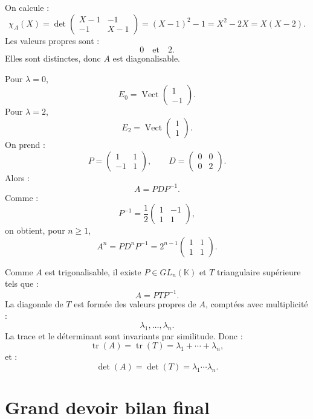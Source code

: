 \documentclass[11pt,a4paper]{article}
\newcommand{\K}{\mathbb K}
\newcommand{\Vect}{\operatorname{Vect}}
\newcommand{\tr}{\operatorname{tr}}
\begin{document}
\begin{correctionbox}[11]
On calcule :
\[
\chi_A(X)=
\det
\begin{pmatrix}
X-1&-1\\
-1&X-1
\end{pmatrix}
=
(X-1)^2-1
=
X^2-2X
=
X(X-2).
\]
Les valeurs propres sont :
\[
0
\quad\text{et}\quad
2.
\]
Elles sont distinctes, donc \(A\) est diagonalisable.

Pour \(\lambda=0\),
\[
E_0=\Vect
\begin{pmatrix}
1\\-1
\end{pmatrix}.
\]
Pour \(\lambda=2\),
\[
E_2=\Vect
\begin{pmatrix}
1\\1
\end{pmatrix}.
\]
On prend :
\[
P=
\begin{pmatrix}
1&1\\
-1&1
\end{pmatrix},
\qquad
D=
\begin{pmatrix}
0&0\\
0&2
\end{pmatrix}.
\]
Alors :
\[
A=PDP^{-1}.
\]
Comme :
\[
P^{-1}=\frac12
\begin{pmatrix}
1&-1\\
1&1
\end{pmatrix},
\]
on obtient, pour \(n\geq1\),
\[
A^n=PD^nP^{-1}
=
2^{n-1}
\begin{pmatrix}
1&1\\
1&1
\end{pmatrix}.
\]
\end{correctionbox}

\begin{correctionbox}[12]
Comme \(A\) est trigonalisable, il existe \(P\in GL_n(\K)\) et \(T\) triangulaire supérieure tels que :
\[
A=PTP^{-1}.
\]
La diagonale de \(T\) est formée des valeurs propres de \(A\), comptées avec multiplicité :
\[
\lambda_1,\dots,\lambda_n.
\]
La trace et le déterminant sont invariants par similitude.  
Donc :
\[
\tr(A)=\tr(T)=\lambda_1+\cdots+\lambda_n,
\]
et :
\[
\det(A)=\det(T)=\lambda_1\cdots\lambda_n.
\]
\end{correctionbox}

\newpage
\section{Grand devoir bilan final}
\end{document}
